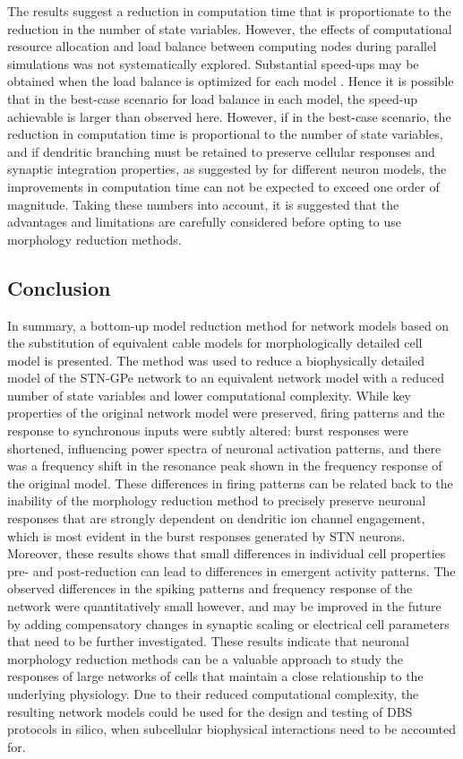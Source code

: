 %
%
%
%
The results suggest a reduction in computation time that is proportionate to the reduction
in the number of state variables. However, the effects of computational resource
allocation and load balance between computing nodes during parallel simulations was not systematically
explored. Substantial speed-ups may be obtained when the load balance is optimized
for each model \cite{migliore_parallel_2006}. Hence it is possible that in the best-case
scenario for load balance in each model, the speed-up achievable is larger than
observed here.
%
%
%
%
%
%
However, if in the best-case scenario, the reduction in computation time is
proportional to the number of state variables, and if dendritic branching
must be retained to preserve cellular responses and synaptic integration properties,
as suggested by \cite{hendrickson_capabilities_2011,elbasiouny_development_2014} for
different neuron models, the improvements in computation time can not be expected to
exceed one order of magnitude. Taking these numbers into account, it is suggested
that the advantages and limitations are carefully considered before opting to
use morphology  reduction methods.
%


%
\subsection{Conclusion}
%

In summary, a bottom-up model reduction method for network models based
on the substitution of equivalent cable models for morphologically detailed
cell model is presented. The method was used to reduce a biophysically
detailed model of the STN-GPe network to an equivalent network model with
a reduced number of state variables and lower computational complexity.
While key properties of the original network model were
preserved, firing patterns and the response to synchronous inputs were
subtly altered: burst responses were shortened, influencing power spectra
of neuronal activation patterns, and there was a frequency shift in the
resonance peak shown in the frequency response of the original model.
%
%
These differences in firing patterns can be related back to the inability of
the morphology reduction method to precisely preserve neuronal responses that
are strongly dependent on dendritic ion channel engagement, which is most
evident in the burst responses generated by STN neurons.
%
Moreover, these results shows that small differences in individual cell properties
pre- and post-reduction can lead to differences in emergent activity patterns.
The observed differences in the spiking patterns and frequency response
of the network were quantitatively small however, and may be improved in the future by
adding compensatory changes in synaptic scaling or electrical cell parameters
that need to be further investigated. These results indicate that neuronal
morphology reduction methods can be a valuable approach to study the responses
of large networks of cells that maintain a close relationship to the underlying
physiology. Due to their reduced computational complexity, the resulting
network models could be used for the design and testing of DBS protocols in
silico, when subcellular biophysical interactions need to be accounted for.

